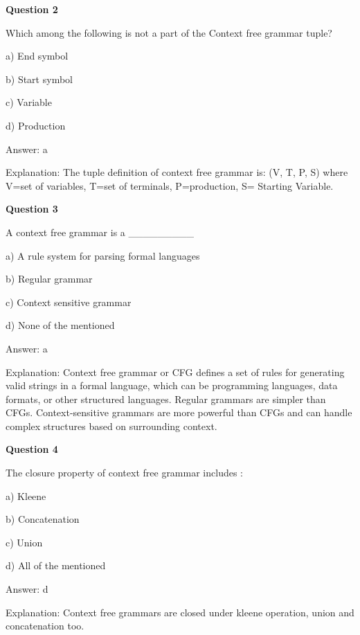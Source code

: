 \documentclass{article}
\begin{document}
\begin{mdframed}[linewidth=1pt, roundcorner=5pt, linecolor=gray!30, backgroundcolor=gray!5]
\textbf{Question 2} 

Which among the following is not a part of the Context free grammar tuple?

a) End symbol

b) Start symbol

c) Variable

d) Production
\vspace{5pt} \par
\begin{tcolorbox}[colback=green!5, colframe=green!40!black, title=Solution]
Answer: a

Explanation: The tuple definition of context free grammar is: (V, T, P, S) where V=set of variables, T=set of terminals, P=production, S= Starting Variable.
\end{tcolorbox}
\end{mdframed}

\begin{mdframed}[linewidth=1pt, roundcorner=5pt, linecolor=gray!30, backgroundcolor=gray!5]
\textbf{Question 3} 

A context free grammar is a \_\_\_\_\_\_\_\_\_

a) A rule system for parsing formal languages

b) Regular grammar

c) Context sensitive grammar

d) None of the mentioned
\vspace{5pt} \par
\begin{tcolorbox}[colback=green!5, colframe=green!40!black, title=Solution]
Answer: a

Explanation: Context free grammar or CFG defines a set of rules for generating valid strings in a formal language, which can be programming languages, data formats, or other structured languages. Regular grammars are simpler than CFGs. Context-sensitive grammars are more powerful than CFGs and can handle complex structures based on surrounding context.
\end{tcolorbox}
\end{mdframed}
\newpage

\begin{mdframed}[linewidth=1pt, roundcorner=5pt, linecolor=gray!30, backgroundcolor=gray!5]
\textbf{Question 4} 

The closure property of context free grammar includes :

a) Kleene

b) Concatenation

c) Union

d) All of the mentioned
\vspace{5pt} \par
\begin{tcolorbox}[colback=green!5, colframe=green!40!black, title=Solution]
Answer: d

Explanation: Context free grammars are closed under kleene operation, union and concatenation too.
\end{tcolorbox}
\end{mdframed}
\end{document}
